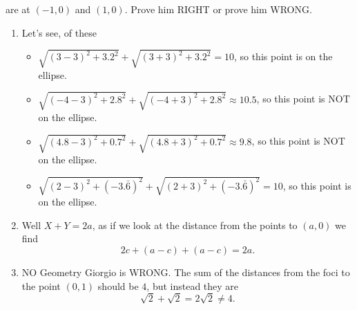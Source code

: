 \documentclass[nooutcomes,noauthor]{ximera}
\begin{document}
\begin{question}
\begin{enumerate}
\begin{center}
      \end{center}
      are at $(-1,0)$ and $(1,0)$. Prove him RIGHT or prove him WRONG.
  \end{enumerate}
  \begin{freeResponse}
    \begin{enumerate}
    \item Let's see, of these
      \begin{itemize}
      \item $\sqrt{(3-3)^2+3.2^2} + \sqrt{(3+3)^2 + 3.2^2} = 10$, so this point is on the ellipse.
      \item $\sqrt{(-4-3)^2+2.8^2} + \sqrt{(-4+3)^2 + 2.8^2} \approx 10.5$, so this point is NOT on the ellipse.
      \item $\sqrt{(4.8-3)^2+0.7^2} + \sqrt{(4.8+3)^2 + 0.7^2} \approx 9.8$, so this point is NOT on the ellipse.
      \item $\sqrt{(2-3)^2+(-3.\bar{6})^2} + \sqrt{(2+3)^2 + (-3.\bar{6})^2} = 10$, so this point is on the ellipse.
      \end{itemize}
    \item Well $X+Y=2a$, as if we look at the distance from the points to $(a,0)$ we find
      \[
      2c + (a-c) + (a-c) = 2a.
      \]
    \item NO Geometry Giorgio is WRONG. The sum of the distances from
      the foci to the point $(0,1)$ should be $4$, but instead they
      are
      \[
      \sqrt{2} + \sqrt{2} = 2\sqrt{2} \ne 4.
      \]
    \end{enumerate}
  \end{freeResponse}
\end{question}
\mynewpage
\end{document}
